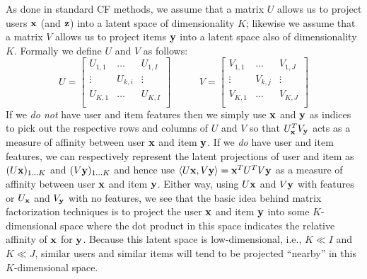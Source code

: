 As done in standard CF methods, we assume that
a matrix $U$ allows us to project users $\mathbf{x}$ (and $\mathbf{z}$)
into a latent space of dimensionality $K$; likewise we assume that
a matrix $V$ allows us to project items $\mathbf{y}$ into a latent
space also of dimensionality $K$.  Formally we define $U$ and $V$
as follows:
\begin{equation*}
U = 
\begin{bmatrix}
  U_{1,1} & \hdots  & U_{1,I} \\
  \vdots  & U_{k,i} & \vdots  \\
  U_{K,1} & \hdots  & U_{K,I} \\
\end{bmatrix}
\qquad \; \; \;
V = 
\begin{bmatrix}
  V_{1,1} & \hdots  & V_{1,J} \\
  \vdots  & V_{k,j} & \vdots  \\
  V_{K,1} & \hdots  & V_{K,J} \\
\end{bmatrix}
\end{equation*}
If we \emph{do not} have user and item features then we simply use
$\mathbf{x}$ and $\mathbf{y}$ as indices to pick out the respective rows and columns
of $U$ and $V$ so that $U_{\mathbf{x}}^T V_{\mathbf{y}}$ acts as a measure of affinity 
between user $\mathbf{x}$ and item $\mathbf{y}$.  If we \emph{do} have user and item
features, we can respectively represent the latent projections of user
and item as $(U \mathbf{x})_{1 \ldots K}$ and $(V \mathbf{y})_{1 \ldots K}$ and hence
use $\langle U \mathbf{x}, V \mathbf{y} \rangle = \mathbf{x}^T U^T V \mathbf{y}$ as a measure of affinity 
between user $\mathbf{x}$ and item $\mathbf{y}$.  Either way, using $U \mathbf{x}$ and $V \mathbf{y}$
with features or $U_{\mathbf{x}}$ and $V_{\mathbf{y}}$ with no features, we see that the
basic idea behind matrix factorization techniques is to project the
user $\mathbf{x}$ and item $\mathbf{y}$ into some $K$-dimensional space where the dot
product in this space indicates the relative affinity of $\mathbf{x}$ for
$\mathbf{y}$.  Because this latent space is low-dimensional, i.e., $K \ll
I$ and $K \ll J$, similar users and similar items will tend to be
projected ``nearby'' in this $K$-dimensional space.

